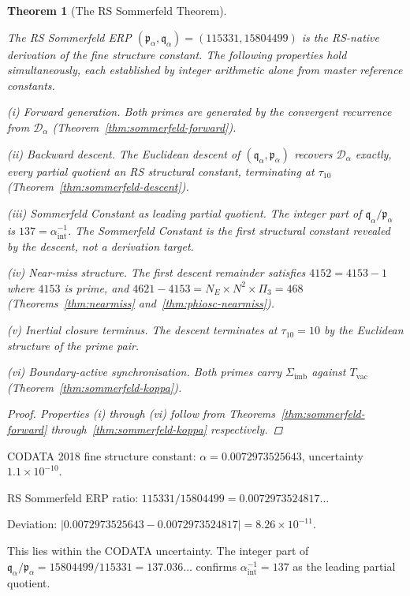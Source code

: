 \documentclass[11pt, letterpaper]{article}
\newcommand{\Sigimb}{\Sigma_{\mathrm{imb}}}
\newcommand{\Tvac}{T_{\mathrm{vac}}}
\newcommand{\tauX}{\tau_{10}}
\newcommand{\Pithree}{\Pi_3}
\newcommand{\aSC}{\alpha^{-1}_{\mathrm{int}}}
\newcommand{\pa}{\mathfrak{p}_\alpha}
\newcommand{\qa}{\mathfrak{q}_\alpha}
\newcommand{\Da}{\mathcal{D}_\alpha}
\theoremstyle{definition}
\theoremstyle{plain}
\newtheorem{theorem}{Theorem}[section]
\begin{document}
\begin{theorem}[The RS Sommerfeld Theorem]\label{thm:sommerfeld}
\begin{rsbox}
The RS Sommerfeld ERP $(\pa,\qa)=(115331,15804499)$ is the RS-native
derivation of the fine structure constant.  The following properties hold
simultaneously, each established by integer arithmetic alone from master
reference constants.

\emph{(i) Forward generation.}  Both primes are generated by the convergent
recurrence from $\Da$ (Theorem~\ref{thm:sommerfeld-forward}).

\emph{(ii) Backward descent.}  The Euclidean descent of $(\qa,\pa)$ recovers
$\Da$ exactly, every partial quotient an RS structural constant, terminating at
$\tauX$ (Theorem~\ref{thm:sommerfeld-descent}).

\emph{(iii) Sommerfeld Constant as leading partial quotient.}  The integer
part of $\qa/\pa$ is $137=\aSC$.  The Sommerfeld Constant is the first
structural constant revealed by the descent, not a derivation target.

\emph{(iv) Near-miss structure.}  The first descent remainder satisfies
$4152=4153-1$ where $4153$ is prime, and $4621-4153=N_E\times
N^2\times\Pithree=468$ (Theorems~\ref{thm:nearmiss}
and~\ref{thm:phiosc-nearmiss}).

\emph{(v) Inertial closure terminus.}  The descent terminates at $\tauX=10$
by the Euclidean structure of the prime pair.

\emph{(vi) Boundary-active synchronisation.}  Both primes carry $\Sigimb$
against $\Tvac$ (Theorem~\ref{thm:sommerfeld-koppa}).
\end{rsbox}
\begin{proof}
Properties (i) through (vi) follow from
Theorems~\ref{thm:sommerfeld-forward} through~\ref{thm:sommerfeld-koppa}
respectively.
\end{proof}
\end{theorem}

\begin{verifybox}
CODATA 2018 fine structure constant:
$\alpha=0.0072973525643$, uncertainty $1.1\times10^{-10}$.

RS Sommerfeld ERP ratio: $115331/15804499=0.0072973524817\ldots$

Deviation: $|0.0072973525643-0.0072973524817|=8.26\times10^{-11}$.

This lies within the CODATA uncertainty.  The integer part of
$\qa/\pa=15804499/115331=137.036\ldots$ confirms $\aSC=137$ as the leading
partial quotient.
\end{verifybox}
\end{document}
